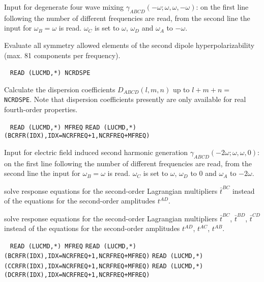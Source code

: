 \begin{description}
Input for degenerate four wave mixing
$\gamma_{ABCD}(-\omega;\omega,\omega,-\omega)$:
on the first line following  the number of different
frequencies are read, from the second line the input for
$\omega_B = \omega$ is read. $\omega_C$ is set to $\omega$,
$\omega_D$ and $\omega_A$ to $-\omega$. 
 
\item[\Key{DIPOLE}] 
Evaluate all symmetry allowed elements of the second dipole
hyperpolarizability (max. 81 components per frequency).

\item[\Key{DISPCF}] \verb| |\newline
\verb|READ (LUCMD,*) NCRDSPE| 

Calculate the dispersion coefficients $D_{ABCD}(l,m,n)$ up  to
$l+m+n = $ \verb+NCRDSPE+.
Note that dispersion coefficients presently are only available for
real fourth-order properties.
 
 
\item[\Key{ESHGFR}] \verb| |\newline
\verb|READ (LUCMD,*) MFREQ|\newline
\verb|READ (LUCMD,*) (BCRFR(IDX),IDX=NCRFREQ+1,NCRFREQ+MFREQ)|

Input for electric field induced second harmonic generation
$\gamma_{ABCD}(-2\omega;\omega,\omega,0)$:
on the first line following  the number of different
frequencies are read, from the second line the input for
$\omega_B = \omega$ is read. $\omega_C$ is set to $\omega$,
$\omega_D$ to $0$ and $\omega_A$ to $-2\omega$. 
 
\item[\Key{L2 BC }] solve response equations for the second-order
Lagrangian multipliers $\bar{t}^{BC}$ instead of the equations for 
the second-order amplitudes $t^{AD}$.
 
\item[\Key{L2 BCD}] solve response equations for the second-order
Lagrangian multipliers $\bar{t}^{BC}$, $\bar{t}^{BD}$, $\bar{t}^{CD}$
instead of the equations for the second-order amplitudes
$t^{AD}$, $t^{AC}$, $t^{AB}$.
 
\item[\Key{MIXFRE}] \verb| |\newline
\verb|READ (LUCMD,*) MFREQ|\newline
\verb|READ (LUCMD,*) (BCRFR(IDX),IDX=NCRFREQ+1,NCRFREQ+MFREQ)|\newline
\verb|READ (LUCMD,*) (CCRFR(IDX),IDX=NCRFREQ+1,NCRFREQ+MFREQ)|\newline
\verb|READ (LUCMD,*) (DCRFR(IDX),IDX=NCRFREQ+1,NCRFREQ+MFREQ)|


\end{description}
